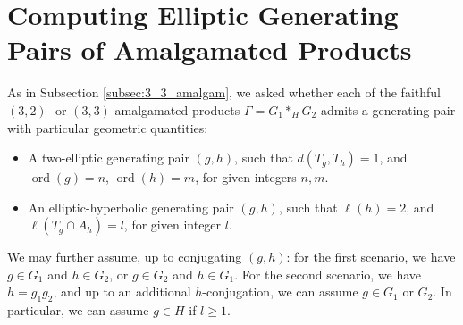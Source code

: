 \documentclass[12pt,leqno]{amsart}
\newcommand{\2}{L^2_{\rm per}(0, T)}
\newcommand{\ord}{{\operatorname{ord}}}
\numberwithin{equation}{section}
\numberwithin{figure}{section}
\begin{document}
\section{Computing Elliptic Generating Pairs of Amalgamated Products}\label{sec:program}
As in Subsection \ref{subsec:3_3_amalgam}, we asked whether each of the faithful $(3,2)$- or $(3,3)$-amalgamated products $\Gamma = G_1*_HG_2$ admits a generating pair with particular geometric quantities:
\begin{itemize}
    \item A two-elliptic generating pair $(g,h)$, such that $d(T_g,T_h) = 1$, and $\ord(g) = n$, $\ord(h) = m$, for given integers $n,m$.
    \item An elliptic-hyperbolic generating pair $(g,h)$, such that $\ell(h) = 2$, and $\ell(T_g\cap A_h) = l$, for given integer $l$.
\end{itemize}
We may further assume, up to conjugating $(g,h)$: for the first scenario, we have $g\in G_1$ and $h\in G_2$, or $g\in G_2$ and $h\in G_1$. For the second scenario, we have $h = g_1g_2$, and up to an additional $h$-conjugation, we can assume $g\in G_1$ or $G_2$. In particular, we can assume $g\in H$ if $l\geq 1$.
\end{document}
